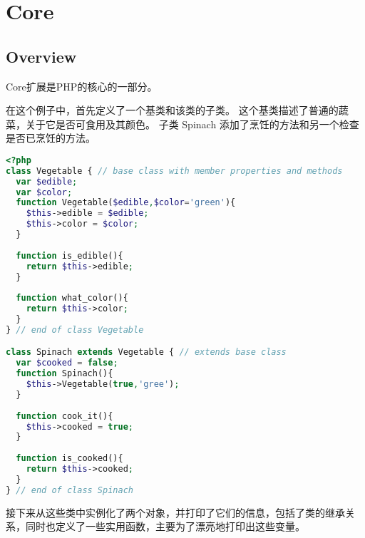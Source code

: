 \part{Core}


\chapter{Overview}

Core扩展是PHP的核心的一部分。

在这个例子中，首先定义了一个基类和该类的子类。 这个基类描述了普通的蔬菜，关于它是否可食用及其颜色。 子类 Spinach 添加了烹饪的方法和另一个检查是否已烹饪的方法。

\begin{lstlisting}[language=PHP]
<?php
class Vegetable { // base class with member properties and methods
  var $edible;
  var $color;
  function Vegetable($edible,$color='green'){
    $this->edible = $edible;
    $this->color = $color;
  }
  
  function is_edible(){
    return $this->edible;
  }
  
  function what_color(){
    return $this->color;
  }
} // end of class Vegetable

class Spinach extends Vegetable { // extends base class
  var $cooked = false;
  function Spinach(){
    $this->Vegetable(true,'gree');
  }
  
  function cook_it(){
    $this->cooked = true;
  }
  
  function is_cooked(){
    return $this->cooked;
  }
} // end of class Spinach
\end{lstlisting}

接下来从这些类中实例化了两个对象，并打印了它们的信息，包括了类的继承关系，同时也定义了一些实用函数，主要为了漂亮地打印出这些变量。


